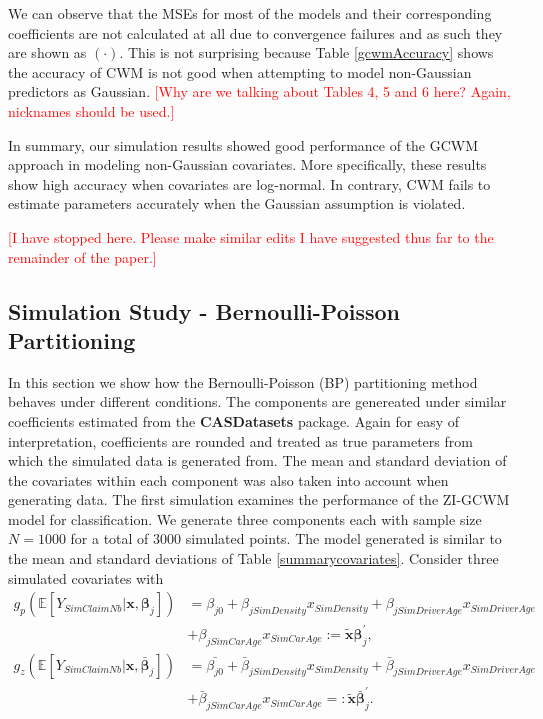 \documentclass[11pt,letterpaper]{article}
\numberwithin{equation}{section}
\numberwithin{equation}{section}
\numberwithin{equation}{section}
\newcommand{\xTilda}{\tilde{\bm{x}}}
\begin{document}
We can observe that the MSEs for most of the models and their corresponding coefficients are not calculated at all due to convergence failures and as such they are shown as $(\cdot)$. This is not surprising because Table \ref{gcwmAccuracy} shows the accuracy of CWM is not good when attempting to model non-Gaussian predictors as Gaussian. \textcolor{red}{[Why are we talking about Tables 4, 5 and 6 here? Again, nicknames should be used.]}

In summary, our simulation results showed good performance of the GCWM approach in modeling non-Gaussian covariates. More specifically, these results show high accuracy when covariates are log-normal. In contrary, CWM fails to estimate parameters accurately when the Gaussian assumption is violated.

\clearpage\textcolor{red}{[I have stopped here. Please make similar edits I have suggested thus far to the remainder of the paper.]}


\subsection{Simulation Study - Bernoulli-Poisson Partitioning}

In this section we show how the Bernoulli-Poisson (BP) partitioning method behaves under different conditions. The components are genereated under similar coefficients estimated from the \textbf{CASDatasets} package. Again for easy of interpretation, coefficients are rounded and treated as true parameters from which the simulated data is generated from. The mean and standard deviation of the covariates within each component was also taken into account when generating data. The first simulation examines the performance of the ZI-GCWM model for classification. We generate three components each with sample size $N=1000$ for a total of $3000$ simulated points.
The model generated is similar to the mean and standard deviations of Table \ref{summarycovariates}. Consider three simulated covariates with 
\begin{align}
g_p(\mathbb{E}\left[Y_{SimClaimNb}|\bm{x}, \bm{\beta}_j \right]) & = 
  \beta_{j0} +  \beta_{jSimDensity} x_{SimDensity} +  \beta_{jSimDriverAge} x_{SimDriverAge} \nonumber  \\ & + 
   \beta_{jSimCarAge} x_{SimCarAge} := \bm{\xTilda} \bm{\beta}_j^{'},  \label{poissonRegSim} \\
g_z(\mathbb{E}\left[Y_{SimClaimNb}|\bm{x} , \bar{\bm{\beta}}_j  \right]) & = 
  \bar{\beta_{j0}} +  \bar{\beta}_{jSimDensity} x_{SimDensity} +  \bar{\beta}_{jSimDriverAge} x_{SimDriverAge} \nonumber \\ & + 
  \bar{ \beta}_{jSimCarAge} x_{SimCarAge} =: \bm{\xTilda} \bar{\bm{\beta}}_j^{'}.  \label{zeroRegSim}
\end{align}
\end{document}
